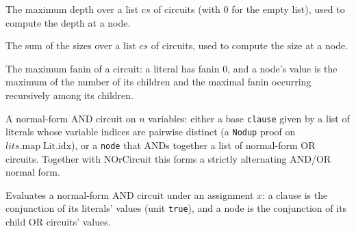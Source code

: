 \begin{definition}
\label{BoolCircuit.TreeCircuit.maxDepth}
\leanok
{}
The maximum depth over a list $cs$ of circuits (with $0$ for the empty list), used to
compute the depth at a node.
\end{definition}

\begin{definition}
\label{BoolCircuit.TreeCircuit.sumSize}
\leanok
{}
The sum of the sizes over a list $cs$ of circuits, used to compute the size at a node.
\end{definition}

\begin{definition}
\label{BoolCircuit.TreeCircuit.maxFanin}
\leanok
{}
The maximum fanin of a circuit: a literal has fanin $0$, and a node's value is the
maximum of the number of its children and the maximal fanin occurring recursively among
its children.
\end{definition}

\begin{definition}
\label{BoolCircuit.NAndCircuit}
\leanok
{}
A normal-form AND circuit on $n$ variables: either a base \texttt{clause} given by a list
of literals whose variable indices are pairwise distinct (a \texttt{Nodup} proof on
$lits.\mathrm{map}\;\mathrm{Lit.idx}$), or a \texttt{node} that ANDs together a list of
normal-form OR circuits. Together with $\mathrm{NOrCircuit}$ this forms a strictly
alternating AND/OR normal form.
\end{definition}

\begin{definition}
\label{BoolCircuit.NAndCircuit.eval}
\leanok
{}
Evaluates a normal-form AND circuit under an assignment $x$: a clause is the conjunction
of its literals' values (unit \texttt{true}), and a node is the conjunction of its child
OR circuits' values.
\end{definition}

